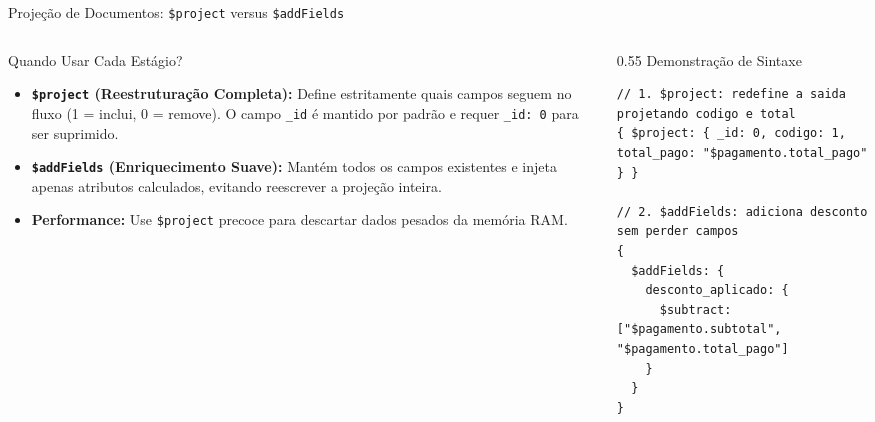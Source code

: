 \begin{frame}[fragile]{Projeção de Documentos: \texttt{\$project} versus \texttt{\$addFields}}
  \vspace{0.1cm}
  \begin{columns}[t,onlytextwidth]
    \begin{column}{0.40\textwidth}
      \alert{Quando Usar Cada Estágio?}\par
      \footnotesize
      \begin{itemize}
        \item \textbf{\lstinline[language=mongosh, basicstyle=\footnotesize\ttfamily]|$project| (Reestruturação Completa):} Define estritamente quais campos seguem no fluxo (1 = inclui, 0 = remove). O campo \lstinline[language=mongosh, basicstyle=\footnotesize\ttfamily]|_id| é mantido por padrão e requer \lstinline[language=mongosh, basicstyle=\footnotesize\ttfamily]|_id: 0| para ser suprimido.
        \item \textbf{\lstinline[language=mongosh, basicstyle=\footnotesize\ttfamily]|$addFields| (Enriquecimento Suave):} Mantém todos os campos existentes e injeta apenas atributos calculados, evitando reescrever a projeção inteira.
        \item \textbf{Performance:} Use \lstinline[language=mongosh, basicstyle=\footnotesize\ttfamily]|$project| precoce para descartar dados pesados da memória RAM.
      \end{itemize}
    \end{column}
    \begin{column}{0.55\textwidth}
      \alert{Demonstração de Sintaxe}\par
      \vspace{0.05cm}
      \begin{lstlisting}[language=mongosh, basicstyle=\scriptsize\ttfamily]
// 1. $project: redefine a saida projetando codigo e total
{ $project: { _id: 0, codigo: 1, total_pago: "$pagamento.total_pago" } }

// 2. $addFields: adiciona desconto sem perder campos
{
  $addFields: {
    desconto_aplicado: {
      $subtract: ["$pagamento.subtotal", "$pagamento.total_pago"]
    }
  }
}
      \end{lstlisting}
    \end{column}
  \end{columns}
\end{frame}

